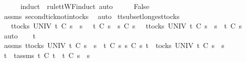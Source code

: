 \ \ \ \ \isamarkupfalse%
\ {\isacharparenleft}induct\ {\isasymrho}\ rule{\isacharcolon}ttWF{\isachardot}induct{\isacharcomma}\ auto{\isacharparenright}\isanewline
\ \ \isamarkupfalse%
\ \isamarkupfalse%
\ False\isanewline
\ \ \ \ \isamarkupfalse%
\ assms{\isacharparenleft}{}{\isacharparenright}\ second{\isacharunderscore}tick{\isacharunderscore}notin{\isacharunderscore}tocks\ \isamarkupfalse%
\ auto\isanewline
{}\isamarkupfalse%
%
\endisatagproof
{\isafoldproof}%
%
\isadelimproof
\isanewline
%
\endisadelimproof
\isanewline
{}\isamarkupfalse%
\ tt{\isacharunderscore}subset{\isacharunderscore}longest{\isacharunderscore}tocks{}{\isacharcolon}\isanewline
\ \ {\isachardoublequoteopen}{\isasymforall}\ t{\isasymin}tocks\ UNIV{\isachardot}\ t\ {\isasymle}\isactrlsub C\ s{}\ {\isacharat}\ s{}\ \ {\isasymlongrightarrow}\ t\ {\isasymle}\isactrlsub C\ s{}\ {\isasymLongrightarrow}\ s{}{\isacharprime}\ {\isasymsubseteq}\isactrlsub C\ s{}\ {\isasymLongrightarrow}\ {\isasymforall}\ t{\isasymin}tocks\ UNIV{\isachardot}\ t\ {\isasymle}\isactrlsub C\ s{}\ {\isacharat}\ s{}{\isacharprime}\ {\isasymlongrightarrow}\ t\ {\isasymle}\isactrlsub C\ s{}{\isachardoublequoteclose}\isanewline
%
\isadelimproof
%
\endisadelimproof
%
\isatagproof
{}\isamarkupfalse%
\ auto\isanewline
\ \ \isamarkupfalse%
\ t\isanewline
\ \ \isamarkupfalse%
\ assms{\isacharcolon}\ {\isachardoublequoteopen}{\isasymforall}t{\isasymin}tocks\ UNIV{\isachardot}\ t\ {\isasymle}\isactrlsub C\ s{}\ {\isacharat}\ s{}\ {\isasymlongrightarrow}\ t\ {\isasymle}\isactrlsub C\ s{}{\isachardoublequoteclose}\ {\isachardoublequoteopen}s{}{\isacharprime}\ {\isasymsubseteq}\isactrlsub C\ s{}{\isachardoublequoteclose}\ {\isachardoublequoteopen}t\ {\isasymin}\ tocks\ UNIV{\isachardoublequoteclose}\ {\isachardoublequoteopen}t\ {\isasymle}\isactrlsub C\ s{}\ {\isacharat}\ s{}{\isacharprime}{\isachardoublequoteclose}\isanewline
\ \ \isamarkupfalse%
\ \isamarkupfalse%
\ t{\isacharprime}\ \ t{\isacharprime}{\isacharunderscore}assms{\isacharcolon}\ {\isachardoublequoteopen}t\ {\isasymsubseteq}\isactrlsub C\ t{\isacharprime}\ {\isasymand}\ t{\isacharprime}\ {\isasymle}\isactrlsub C\ s{}\ {\isacharat}\ s{}{\isachardoublequoteclose}\isanewline
